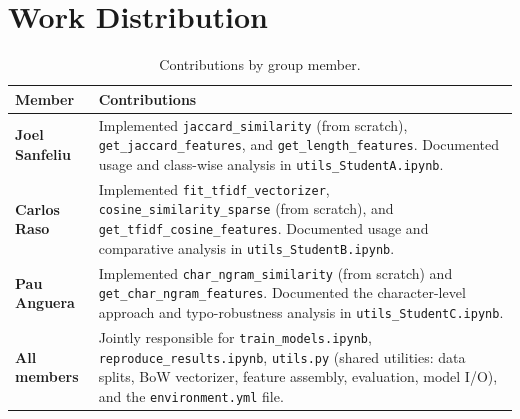 \documentclass[11pt,a4paper]{article}
\begin{document}
\section{Work Distribution}
\label{sec:contributions}

\begin{table}[h]
\centering
\caption{Contributions by group member.}
\begin{tabularx}{\textwidth}{lX}
\toprule
\textbf{Member} & \textbf{Contributions} \\
\midrule
\textbf{Joel Sanfeliu}
    & Implemented \texttt{jaccard\_similarity} (from scratch), \texttt{get\_jaccard\_features}, and \texttt{get\_length\_features}. Documented usage and class-wise analysis in \texttt{utils\_StudentA.ipynb}. \\[4pt]
\textbf{Carlos Raso}
    & Implemented \texttt{fit\_tfidf\_vectorizer}, \texttt{cosine\_similarity\_sparse} (from scratch), and \texttt{get\_tfidf\_cosine\_features}. Documented usage and comparative analysis in \texttt{utils\_StudentB.ipynb}. \\[4pt]
\textbf{Pau Anguera}
    & Implemented \texttt{char\_ngram\_similarity} (from scratch) and \texttt{get\_char\_ngram\_features}. Documented the character-level approach and typo-robustness analysis in \texttt{utils\_StudentC.ipynb}. \\
\midrule
\textbf{All members}
    & Jointly responsible for \texttt{train\_models.ipynb}, \texttt{reproduce\_results.ipynb}, \texttt{utils.py} (shared utilities: data splits, BoW vectorizer, feature assembly, evaluation, model I/O), and the \texttt{environment.yml} file. \\
\bottomrule
\end{tabularx}
\end{table}
\end{document}
